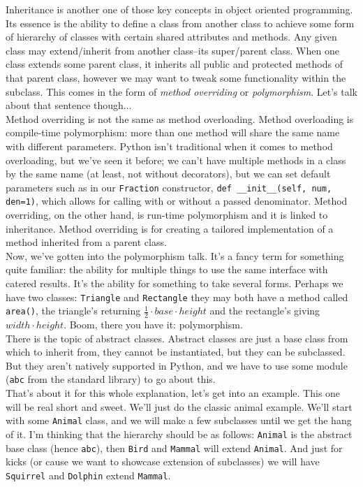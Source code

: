 \documentclass[12pt]{article}
\begin{document}
Inheritance is another one of those key concepts in object oriented programming. Its essence is the ability to define a class from another class to achieve some form of hierarchy of classes with certain shared attributes and methods. Any given class may extend/inherit from another class--its super/parent class. When one class extends some parent class, it inherits all public and protected methods of that parent class, however we may want to tweak some functionality within the subclass. This comes in the form of \textit{method overriding} or \textit{polymorphism}. Let's talk about that sentence though...\\
Method overriding is not the same as method overloading. Method overloading is compile-time polymorphism: more than one method will share the same name with different parameters. Python isn't traditional when it comes to method overloading, but we've seen it before; we can't have multiple methods in a class by the same name (at least, not without decorators), but we can set default parameters such as in our \texttt{Fraction} constructor, \texttt{def \_\_init\_\_(self, num, den=1)}, which allows for calling with or without a passed denominator. Method overriding, on the other hand, is run-time polymorphism and it is linked to inheritance. Method overriding is for creating a tailored implementation of a method inherited from a parent class.\\
Now, we've gotten into the polymorphism talk. It's a fancy term for something quite familiar: the ability for multiple things to use the same interface with catered results. It's the ability for something to take several forms. Perhaps we have two classes: \texttt{Triangle} and \texttt{Rectangle} they may both have a method called \texttt{area()}, the triangle's returning $\frac{1}{2} \cdot base \cdot height$ and the rectangle's giving $width \cdot height$. Boom, there you have it: polymorphism.\\
There is the topic of abstract classes. Abstract classes are just a base class from which to inherit from, they cannot be instantiated, but they can be subclassed. But they aren't natively supported in Python, and we have to use some module (\texttt{abc} from the standard library) to go about this.\\
That's about it for this whole explanation, let's get into an example. This one will be real short and sweet. We'll just do the classic animal example. We'll start with some \texttt{Animal} class, and we will make a few subclasses until we get the hang of it. I'm thinking that the hierarchy should be as follows: \texttt{Animal} is the abstract base class (hence \texttt{abc}), then \texttt{Bird} and \texttt{Mammal} will extend \texttt{Animal}. And just for kicks (or cause we want to showcase extension of subclasses) we will have \texttt{Squirrel} and \texttt{Dolphin} extend \texttt{Mammal}.\\
\end{document}
